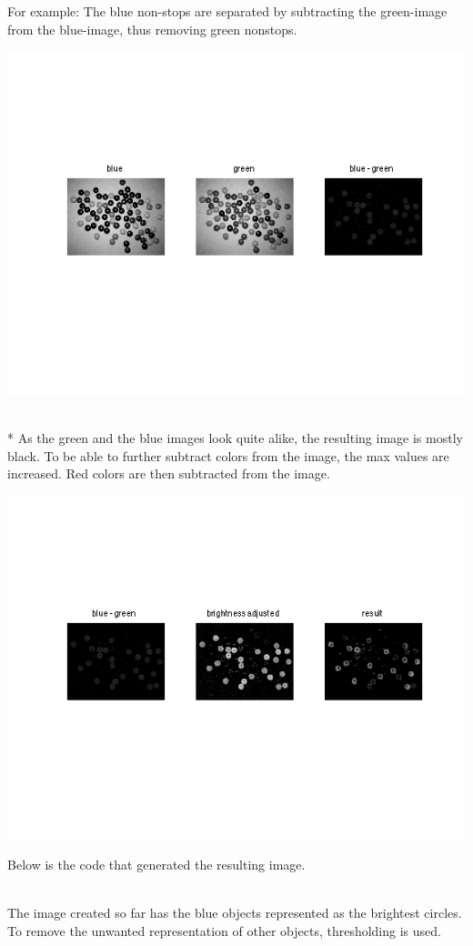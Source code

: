 For example: The blue non-stops are separated by subtracting the green-image from the blue-image, thus removing green nonstops. 
\\
\centerline{\includegraphics[clip=true, trim=40 100 40 80]{separate_step1.png}}
\\*
As the green and the blue images look quite alike, the resulting image is mostly black. To be able to further subtract colors from the image, the max values are increased. Red colors are then subtracted from the image.
\\
\centerline{\includegraphics[clip=true, trim=40 100 40 80]{separate_step2_1.png}}
\mbox{}\newpage
Below is the code that generated the resulting image. 

\mbox{}\\
The image created so far has the blue objects represented as the brightest circles. To remove the unwanted representation of other objects, thresholding is used.

